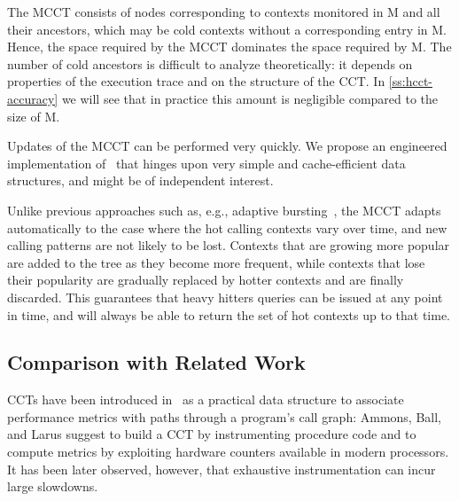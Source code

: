 The MCCT consists of nodes corresponding to contexts monitored in M and all their ancestors, which may be cold contexts without a corresponding entry in M. Hence, the space required by the MCCT dominates the space required by M. The number of cold ancestors is difficult to analyze theoretically: it depends on properties of the execution trace and on the structure of the CCT. In \mysection\ref{ss:hcct-accuracy} we will see that in practice this amount is negligible compared to the size of M.

Updates of the MCCT can be performed very quickly. We propose an engineered implementation of \spacesaving\ that hinges upon very simple and cache-efficient data structures, and might be of independent interest.

Unlike previous approaches such as, e.g., adaptive bursting~\cite{Zhuang06}, the MCCT adapts automatically to the case where the hot calling contexts vary over time, and new calling patterns are not likely to be lost. Contexts that are growing more popular are added to the tree as they become more frequent, while contexts that lose their popularity are gradually replaced by hotter contexts and are finally discarded. This guarantees that heavy hitters queries can be issued at any point in time, and will always be able to return the set of hot contexts up to that time.



\subsection{Comparison with Related Work}

CCTs have been introduced in~\cite{Ammons97} as a practical data structure to associate performance metrics with paths through a program's call graph: Ammons, Ball, and Larus suggest to build a CCT by instrumenting procedure code and to compute metrics by exploiting hardware counters available in modern processors. It has been later observed, however, that exhaustive instrumentation can incur large slowdowns.

